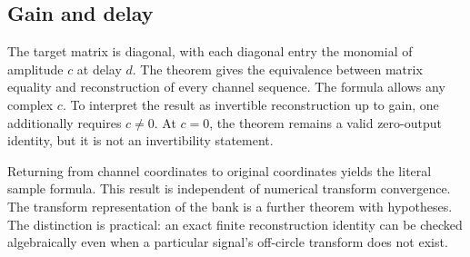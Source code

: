 \subsection{Gain and delay}
The target matrix is diagonal, with each diagonal entry the monomial of amplitude $c$ at delay $d$. The theorem gives the equivalence between matrix equality and reconstruction of every channel sequence.
The formula allows any complex $c$. To interpret the result as invertible reconstruction up to gain, one additionally requires $c\ne0$. At $c=0$, the theorem remains a valid zero-output identity, but it is not an invertibility statement.

Returning from channel coordinates to original coordinates yields the literal sample formula.
This result is independent of numerical transform convergence. The transform representation of the bank is a further theorem with  hypotheses. The distinction is practical: an exact finite reconstruction identity can be checked algebraically even when a particular signal's off-circle transform does not exist.
